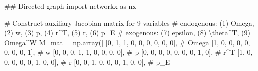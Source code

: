 \documentclass[
  letterpaper,
  DIV=11,
  numbers=noendperiod]{scrreprt}
\newenvironment{Shaded}{\begin{snugshade}}{\end{snugshade}}
\newcommand{\CommentTok}[1]{\textcolor[rgb]{0.37,0.37,0.37}{#1}}
\newcommand{\DecValTok}[1]{\textcolor[rgb]{0.68,0.00,0.00}{#1}}
\newcommand{\ImportTok}[1]{\textcolor[rgb]{0.00,0.46,0.62}{#1}}
\newcommand{\NormalTok}[1]{\textcolor[rgb]{0.00,0.23,0.31}{#1}}
\newcommand{\OperatorTok}[1]{\textcolor[rgb]{0.37,0.37,0.37}{#1}}
\begin{document}
\begin{tcolorbox}[enhanced jigsaw, titlerule=0mm, breakable, bottomrule=.15mm, toprule=.15mm, colbacktitle=quarto-callout-note-color!10!white, rightrule=.15mm, toptitle=1mm, opacityback=0, left=2mm, coltitle=black, title=\textcolor{quarto-callout-note-color}{\faInfo}\hspace{0.5em}{Python code}, colframe=quarto-callout-note-color-frame, opacitybacktitle=0.6, leftrule=.75mm, bottomtitle=1mm, arc=.35mm, colback=white]

\begin{Shaded}
\begin{Highlighting}[]
\CommentTok{\#\# Directed graph}
\ImportTok{import}\NormalTok{ networkx }\ImportTok{as}\NormalTok{ nx}

\CommentTok{\# Construct auxiliary Jacobian matrix for 9 variables}
\CommentTok{\# endogenous: (1) Omega, (2) w, (3) p, (4) r\^{}T, (5) r, (6) p\_E}
\CommentTok{\# exogenous: (7) epsilon, (8) \textbackslash{}theta\^{}T, (9) Omega\^{}W}
\NormalTok{M\_mat }\OperatorTok{=}\NormalTok{ np.array([}
\NormalTok{    [}\DecValTok{0}\NormalTok{, }\DecValTok{1}\NormalTok{, }\DecValTok{1}\NormalTok{, }\DecValTok{0}\NormalTok{, }\DecValTok{0}\NormalTok{, }\DecValTok{0}\NormalTok{, }\DecValTok{0}\NormalTok{, }\DecValTok{0}\NormalTok{, }\DecValTok{0}\NormalTok{],  }\CommentTok{\# Omega}
\NormalTok{    [}\DecValTok{1}\NormalTok{, }\DecValTok{0}\NormalTok{, }\DecValTok{0}\NormalTok{, }\DecValTok{0}\NormalTok{, }\DecValTok{0}\NormalTok{, }\DecValTok{0}\NormalTok{, }\DecValTok{0}\NormalTok{, }\DecValTok{0}\NormalTok{, }\DecValTok{1}\NormalTok{],  }\CommentTok{\# w}
\NormalTok{    [}\DecValTok{0}\NormalTok{, }\DecValTok{0}\NormalTok{, }\DecValTok{0}\NormalTok{, }\DecValTok{1}\NormalTok{, }\DecValTok{1}\NormalTok{, }\DecValTok{0}\NormalTok{, }\DecValTok{0}\NormalTok{, }\DecValTok{0}\NormalTok{, }\DecValTok{0}\NormalTok{],  }\CommentTok{\# p}
\NormalTok{    [}\DecValTok{0}\NormalTok{, }\DecValTok{0}\NormalTok{, }\DecValTok{0}\NormalTok{, }\DecValTok{0}\NormalTok{, }\DecValTok{0}\NormalTok{, }\DecValTok{0}\NormalTok{, }\DecValTok{0}\NormalTok{, }\DecValTok{1}\NormalTok{, }\DecValTok{0}\NormalTok{],  }\CommentTok{\# r\^{}T}
\NormalTok{    [}\DecValTok{1}\NormalTok{, }\DecValTok{0}\NormalTok{, }\DecValTok{0}\NormalTok{, }\DecValTok{0}\NormalTok{, }\DecValTok{0}\NormalTok{, }\DecValTok{0}\NormalTok{, }\DecValTok{1}\NormalTok{, }\DecValTok{0}\NormalTok{, }\DecValTok{0}\NormalTok{],  }\CommentTok{\# r}
\NormalTok{    [}\DecValTok{0}\NormalTok{, }\DecValTok{0}\NormalTok{, }\DecValTok{1}\NormalTok{, }\DecValTok{0}\NormalTok{, }\DecValTok{0}\NormalTok{, }\DecValTok{0}\NormalTok{, }\DecValTok{1}\NormalTok{, }\DecValTok{0}\NormalTok{, }\DecValTok{0}\NormalTok{],  }\CommentTok{\# p\_E}

\end{Highlighting}
\end{Shaded}
\end{tcolorbox}
\end{document}
